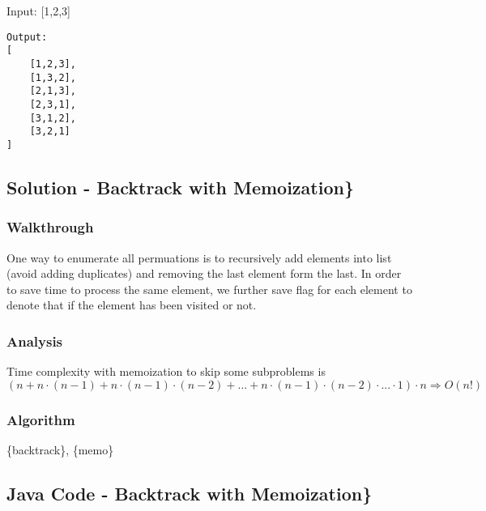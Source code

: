 \documentclass[]{book}
\begin{document}
Input: {[}1,2,3{]}

\begin{verbatim}
Output:
[
    [1,2,3],
    [1,3,2],
    [2,1,3],
    [2,3,1],
    [3,1,2],
    [3,2,1]
]
\end{verbatim}

\hypertarget{solution---backtrack-with-memoization}{%
\subsection{Solution - Backtrack with Memoization\}}\label{solution---backtrack-with-memoization}}

\hypertarget{walkthrough-12}{%
\subsubsection{Walkthrough}\label{walkthrough-12}}

One way to enumerate all permuations is to recursively add elements into list (avoid adding duplicates) and removing
the last element form the last. In order to save time to process the same element, we further save flag for each element
to denote that if the element has been visited or not.

\hypertarget{analysis-14}{%
\subsubsection{Analysis}\label{analysis-14}}

Time complexity with memoization to skip some subproblems is
\((n + n\cdot (n - 1) + n\cdot (n - 1)\cdot (n - 2) + ... + n\cdot (n - 1)\cdot (n - 2)\cdot ...\cdot 1) \cdot n \Rightarrow O(n!)\)

\hypertarget{algorithm-14}{%
\subsubsection{Algorithm}\label{algorithm-14}}

\{backtrack\}, \{memo\}

\hypertarget{java-code---backtrack-with-memoization}{%
\subsection{Java Code - Backtrack with Memoization\}}\label{java-code---backtrack-with-memoization}}
\end{document}
